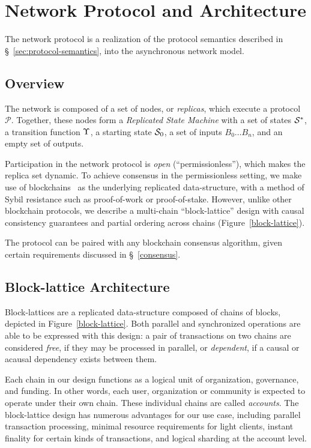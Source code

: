 \section{Network Protocol and Architecture}

The \oscoin{} network protocol is a realization of the protocol semantics
described in \S~\ref{sec:protocol-semantics}, into the asynchronous network
model.

\subsection{Overview}

The \oscoin{} network is composed of a set of nodes, or \emph{replicas}, which
execute a protocol $\mathcal{P}$. Together, these nodes form a \emph{Replicated
State Machine} with a set of states $\mathcal{S}^*$, a transition function $\Upsilon$,
a starting state $\mathcal{S}_0$, a set of inputs $B_0 \dotso B_n$, and an empty set
of outputs.


Participation in the network protocol is \emph{open} (\ie ``permissionless''),
which makes the replica set dynamic. To achieve consensus in the permissionless
setting, we make use of blockchains~\cite{bitcoin} as the underlying replicated
data-structure, with a method of Sybil resistance such as proof-of-work or
proof-of-stake.  However, unlike other blockchain protocols, we describe a
multi-chain ``block-lattice'' \cite{raiblocks} design with causal consistency
guarantees \cite{causal-consistency} and partial ordering across chains
(Figure~\ref{block-lattice}).

The \oscoin{} protocol can be paired with any blockchain consensus algorithm,
given certain requirements discussed in \S~\ref{consensus}.

\subsection{Block-lattice Architecture}

Block-lattices are a replicated data-structure composed of chains of blocks,
depicted in Figure~\ref{block-lattice}.  Both parallel and synchronized
operations are able to be expressed with this design:  a pair of transactions
on two chains are considered \emph{free}, if they may be processed in parallel,
or \emph{dependent}, if a causal or acausal dependency exists between them.

Each chain in our design functions as a logical unit of organization,
governance, and funding. In other words, each user, organization or community
is expected to operate under their own chain. These individual chains are
called \emph{accounts}. The block-lattice design has numerous advantages for
our use case, including parallel transaction processing, minimal resource
requirements for light clients, instant finality for certain kinds of
transactions, and logical sharding at the account level.

